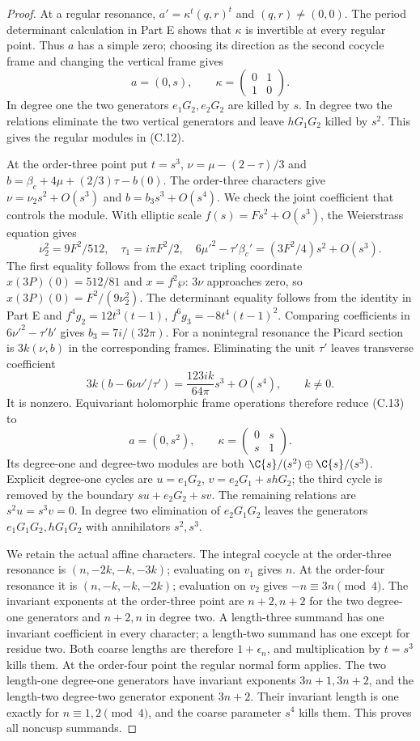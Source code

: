 \begin{proof}
At a regular resonance, $a'=\kappa^t(q,r)^t$ and $(q,r)\ne(0,0)$. The period determinant calculation in Part E shows that $\kappa$ is invertible at every regular point. Thus $a$ has a simple zero; choosing its direction as the second cocycle frame and changing the vertical frame gives
\[
 a=(0,s),\qquad\kappa=\begin{pmatrix}0&1\\1&0\end{pmatrix}.
\]
In degree one the two generators $e_1G_2,e_2G_2$ are killed by $s$. In degree two the relations eliminate the two vertical generators and leave $hG_1G_2$ killed by $s^2$. This gives the regular modules in (C.12).

At the order-three point put $t=s^3$, $\nu=\mu-(2-\tau)/3$ and $b=\beta_c+4\mu+(2/3)\tau-b(0)$. The order-three characters give $\nu=\nu_2s^2+O(s^3)$ and $b=b_3s^3+O(s^4)$. We check the joint coefficient that controls the module. With elliptic scale $f(s)=Fs^2+O(s^3)$, the Weierstrass equation gives
\[
 \nu_2^2=9F^2/512,\quad \tau_1=i\pi F^2/2,\quad
 6\mu'^2-\tau'\beta_c'=(3F^2/4)s^2+O(s^3).
\]
The first equality follows from the exact tripling coordinate $x(3P)(0)=512/81$ and $x=f^2\wp$: $3\nu$ approaches zero, so $x(3P)(0)=F^2/(9\nu_2^2)$. The determinant equality follows from the identity in Part E and $f^4g_2=12t^3(t-1)$, $f^6g_3=-8t^4(t-1)^2$. Comparing coefficients in $6\nu'^2-\tau'b'$ gives $b_3=7i/(32\pi)$. For a nonintegral resonance the Picard section is $3k(\nu,b)$ in the corresponding frames. Eliminating the unit $\tau'$ leaves transverse coefficient
\[
 3k(b-6\nu\nu'/\tau')
   =\frac{123ik}{64\pi}s^3+O(s^4),\qquad k\ne0.        \tag{C.14}
\]
It is nonzero. Equivariant holomorphic frame operations therefore reduce (C.13) to
\[
 a=(0,s^2),\qquad\kappa=\begin{pmatrix}0&s\\s&1\end{pmatrix}.
\]
Its degree-one and degree-two modules are both $\C\{s\}/(s^2)\oplus\C\{s\}/(s^3)$. Explicit degree-one cycles are $u=e_1G_2$, $v=e_2G_1+shG_2$; the third cycle is removed by the boundary $su+e_2G_2+sv$. The remaining relations are $s^2u=s^3v=0$. In degree two elimination of $e_2G_1G_2$ leaves the generators $e_1G_1G_2,hG_1G_2$ with annihilators $s^2,s^3$.

We retain the actual affine characters. The integral cocycle at the order-three resonance is $(n,-2k,-k,-3k)$; evaluating on $v_1$ gives $n$. At the order-four resonance it is $(n,-k,-k,-2k)$; evaluation on $v_2$ gives $-n\equiv3n\pmod4$. The invariant exponents at the order-three point are $n+2,n+2$ for the two degree-one generators and $n+2,n$ in degree two. A length-three summand has one invariant coefficient in every character; a length-two summand has one except for residue two. Both coarse lengths are therefore $1+\epsilon_n$, and multiplication by $t=s^3$ kills them. At the order-four point the regular normal form applies. The two length-one degree-one generators have invariant exponents $3n+1,3n+2$, and the length-two degree-two generator exponent $3n+2$. Their invariant length is one exactly for $n\equiv1,2\pmod4$, and the coarse parameter $s^4$ kills them. This proves all noncusp summands.


\end{proof}
